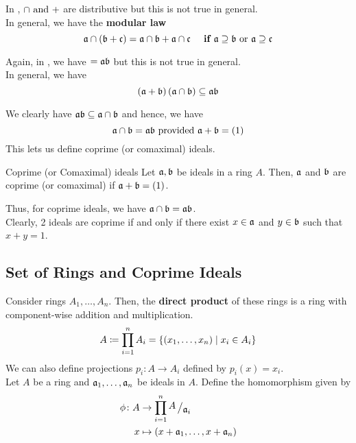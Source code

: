 In \ZZ, \( \cap \text{ and } + \) are distributive but this is not true in
general. \\
In general, we have the \textbf{modular law}
\[
	\mathfrak{a} \cap \left( \mathfrak{b} + \mathfrak{c} \right) = \mathfrak{a} \cap \mathfrak{b} + \mathfrak{a} \cap \mathfrak{c}
	\quad
	\textbf{ if } \mathfrak{a} \supseteq  \mathfrak{b} \text{ or } \mathfrak{a} \supseteq \mathfrak{c}
\]

Again, in \ZZ, we have \brak{\mfa + \mfb}\brak{\mfa \cap \mfb}
\( = \mathfrak{a} \mathfrak{b} \) but this is not true in general. \\
In general, we have
\[
	\left( \mathfrak{a} + \mathfrak{b} \right) \left( \mathfrak{a} \cap \mathfrak{b} \right) \subseteq \mathfrak{a} \mathfrak{b}
\]


We clearly have \( \mathfrak{a} \mathfrak{b} \subseteq \mathfrak{a} \cap \mathfrak{b} \) and hence,
we have
\[
	\mathfrak{a} \cap \mathfrak{b} = \mathfrak{a} \mathfrak{b} \text{ provided } \mathfrak{a} + \mathfrak{b} = \left( 1 \right)
\]
This lets us define coprime (or comaximal) ideals.

\begin{defn}{Coprime (or Comaximal) ideals}{}
	Let \( \mathfrak{a}, \mathfrak{b} \) be ideals in a ring \( A \).
	Then, \( \mathfrak{a} \) and \( \mathfrak{b} \) are coprime (or comaximal) if
	\( \mathfrak{a} + \mathfrak{b} = \left( 1 \right) \).
\end{defn}
Thus, for coprime ideals, we have \( \mathfrak{a} \cap \mathfrak{b} = \mathfrak{a} \mathfrak{b} \). \\
Clearly, 2 ideals are coprime if and only if there exist
\( x \in \mathfrak{a} \) and \( y \in \mathfrak{b} \) such that \( x + y = 1 \). \\


\subsection{Set of Rings and Coprime Ideals}

Consider rings \( A_1, \ldots, A_n \).
Then, the \textbf{direct product} of these rings
is a ring with component-wise addition and multiplication.
\[
	A \coloneqq \prod_{i=1}^n A_i =
	\left\{ (x_1, \ldots, x_n) \mid x_i \in A_i \right\}
\]
We can also define projections \( p_i: A \to A_i \)
defined by \( p_i(x) = x_i \). \\

Let \( A \) be a ring and \( \mathfrak{a}_1, \ldots, \mathfrak{a}_n \) be ideals in \( A \).
Define the homomorphism given by
\begin{align*}
	\phi \colon A &\to \prod_{i=1}^n \bigslant{A}{\mfa_i} \\
	x &\mapsto (x + \mfa_1, \ldots, x + \mfa_n)
\end{align*}


